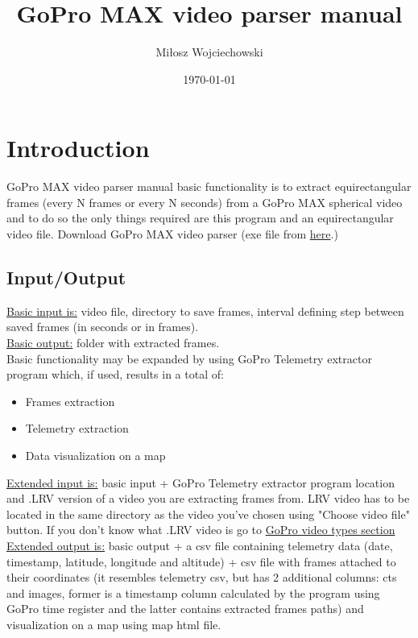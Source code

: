 \documentclass[a4paper,12pt]{book}
\begin{document}
\author{Miłosz Wojciechowski}
\title{GoPro MAX video parser manual}
\date{\today}


\maketitle
\pagebreak
{}
\renewcommand{\labelenumii}{\arabic{enumi}.\arabic{enumii}}
\tableofcontents
\chapter{Introduction}
GoPro MAX video parser manual basic functionality is to extract equirectangular frames (every N frames or every N seconds) from a GoPro MAX spherical video and to do so the only things required are this program and an equirectangular video file. Download GoPro MAX video parser (exe file from \href{https://github.com/miloszwojciechowski/Warsaw-model/releases}{here}.)\\

\section{Input/Output}

\underline{Basic input is:} video file, directory to save frames, interval defining step between saved frames (in seconds or in frames).\\

\underline{Basic output:} folder with extracted frames.\\

Basic functionality may be expanded by using GoPro Telemetry extractor program which, if used, results in a total of:
\begin{itemize}
	\item Frames extraction
	\item Telemetry extraction
	\item Data visualization on a map
\end{itemize}

\underline{Extended input is:} basic input + GoPro Telemetry extractor program location and .LRV version of a video you are extracting frames from. LRV video has to be located in the same directory as the video you've chosen using "Choose video file" button. If you don't know what .LRV video is go to \hyperref[sec:video]{GoPro video types section}\\

\underline{Extended output is:} basic output + a csv file containing telemetry data (date, timestamp, latitude, longitude and altitude) + csv file with frames attached to their coordinates (it resembles telemetry csv, but has 2 additional columns: cts and images, former is a timestamp column calculated by the program using GoPro time register and the latter contains extracted frames paths) and visualization on a map using map html file.
\end{document}
